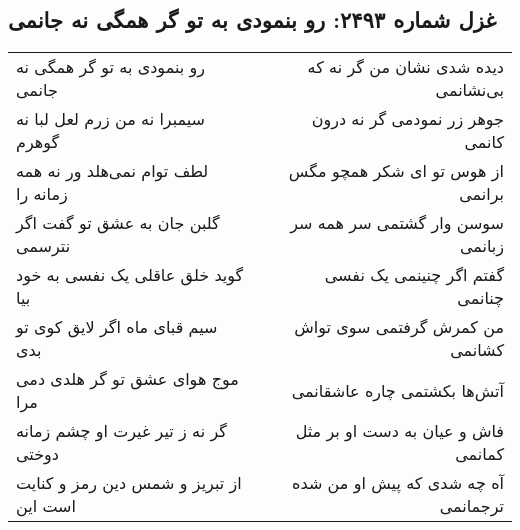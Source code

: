 \begin{center}
\section*{غزل شماره ۲۴۹۳: رو بنمودی به تو گر همگی نه جانمی}
\label{sec:2493}
\begin{longtable}{l p{0.5cm} r}
رو بنمودی به تو گر همگی نه جانمی
&&
دیده شدی نشان من گر نه که بی‌نشانمی
\\
سیمبرا نه من زرم لعل لبا نه گوهرم
&&
جوهر زر نمودمی گر نه درون کانمی
\\
لطف توام نمی‌هلد ور نه همه زمانه را
&&
از هوس تو ای شکر همچو مگس برانمی
\\
گلبن جان به عشق تو گفت اگر نترسمی
&&
سوسن وار گشتمی سر همه سر زبانمی
\\
گوید خلق عاقلی یک نفسی به خود بیا
&&
گفتم اگر چنینمی یک نفسی چنانمی
\\
سیم قبای ماه اگر لایق کوی تو بدی
&&
من کمرش گرفتمی سوی تواش کشانمی
\\
موج هوای عشق تو گر هلدی دمی مرا
&&
آتش‌ها بکشتمی چاره عاشقانمی
\\
گر نه ز تیر غیرت او چشم زمانه دوختی
&&
فاش و عیان به دست او بر مثل کمانمی
\\
از تبریز و شمس دین رمز و کنایت است این
&&
آه چه شدی که پیش او من شده ترجمانمی
\\
\end{longtable}
\end{center}
